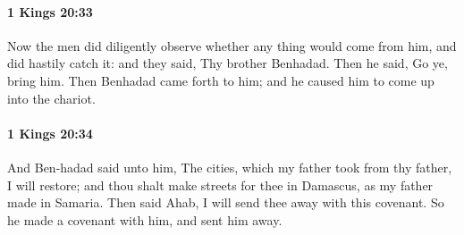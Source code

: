 		\paragraph{1 Kings 20:33} %
			\label{1KINGS-20-33}

			Now the men did diligently observe whether any thing would come from him, and did hastily catch it: and they said, Thy brother Benhadad. Then he said, Go ye, bring him. Then Benhadad came forth to him; and he caused him to come up into the chariot.


		\paragraph{1 Kings 20:34} %
			\label{1KINGS-20-34}

			And Ben-hadad said unto him, The cities, which my father took from thy father, I will restore; and thou shalt make streets for thee in Damascus, as my father made in Samaria. Then said Ahab, I will send thee away with this covenant. So he made a covenant with him, and sent him away.

